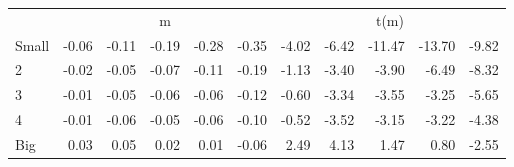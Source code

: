 \begin{table}[!ht]
\begin{tabular}{lrrrrrrrrrr}
  
     & \multicolumn{5}{c}{m} & \multicolumn{5}{c}{t(m)}   \\
     \cmidrule(r){2-6} \cmidrule(r){7-11} 
    Small  & -0.06  & -0.11  & -0.19  & -0.28  & -0.35  & -4.02  & -6.42  & -11.47  & -13.70  & -9.82   \\
    2  & -0.02  & -0.05  & -0.07  & -0.11  & -0.19  & -1.13  & -3.40  & -3.90  & -6.49  & -8.32   \\
    3  & -0.01  & -0.05  & -0.06  & -0.06  & -0.12  & -0.60  & -3.34  & -3.55  & -3.25  & -5.65   \\
    4  & -0.01  & -0.06  & -0.05  & -0.06  & -0.10  & -0.52  & -3.52  & -3.15  & -3.22  & -4.38   \\
    Big  & 0.03  & 0.05  & 0.02  & 0.01  & -0.06  & 2.49  & 4.13  & 1.47  & 0.80  & -2.55   \\
    
  
  \bottomrule
\end{tabular}
\label{tbl:25_Size_RVar_F17}
\end{table}